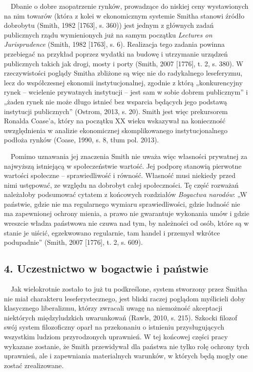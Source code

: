 \documentclass[a4paper]{article}
\begin{document}
\ \ Dbanie o dobre zaopatrzenie rynków, prowadzące do niskiej ceny wystawionych na nim towarów (która z kolei w ekonomicznym systemie Smitha stanowi źródło dobrobytu \label{ref:RND3lhiPntOYy}(Smith, 1982 [1763], s. 360)) jest jednym z głównych zadań publicznych rządu wymienionych już na samym początku \textit{Lectures on Jurisprudence }\label{ref:RNDcEz98pxQ1r}(Smith, 1982 [1763], s. 6). Realizacja tego zadania powinna przebiegać na przykład poprzez wydatki na budowę i utrzymanie urządzeń publicznych takich jak drogi, mosty i porty \label{ref:RNDun5237a8bv}(Smith, 2007 [1776], t. 2, s. 380). W rzeczywistości poglądy Smitha zbliżone są więc nie do radykalnego leseferyzmu, lecz do współczesnej ekonomii instytucjonalnej, zgodnie z którą „konkurencyjny rynek – wcielenie prywatnych instytucji – jest sam w sobie dobrem publicznym” i „żaden rynek nie może długo istnieć bez wsparcia będących jego podstawą instytucji publicznych” \label{ref:RNDjhM4fjDb9v}(Ostrom, 2013, s. 20). Smith jest więc prekursorem Ronalda Coase’a, który na początku XX wieku wskazywał na konieczność uwzględnienia w analizie ekonomicznej skomplikowanego instytucjonalnego podłoża rynków \label{ref:RNDGvBhji2UBe}(Coase, 1990, s. 8, tłum pol. 2013). 

 \ \ Pomimo uznawania jej znaczenia Smith nie uważa więc własności prywatnej za najwyższą istniejącą w społeczeństwie wartość. Jej podporę stanowią pierwotne wartości społeczne – sprawiedliwość i równość. Własność musi niekiedy przed nimi ustępować, ze względu na dobrobyt całej społeczności. Tę część rozważań należałoby podsumować cytatem z końcowych rozdziałów \textit{Bogactwa narodów}: „W państwie, gdzie nie ma regularnego wymiaru sprawiedliwości, gdzie ludność nie ma zapewnionej ochrony mienia, a prawo nie gwarantuje wykonania umów i gdzie wreszcie władza państwowa nie czuwa nad tym, by należności od osób, które są w stanie je uiścić, egzekwowano regularnie, tam handel i przemysł wkrótce podupadnie” \label{ref:RNDNF5lVCSa0q}(Smith, 2007 [1776], t. 2, s. 609).

\subsection[4. Uczestnictwo w bogactwie i państwie]{4. Uczestnictwo w bogactwie i państwie}
\ \ Jak wielokrotnie zostało to już tu podkreślone, system stworzony przez Smitha nie miał charakteru leseferystecznego, jest bliski raczej poglądom myślicieli doby klasycznego liberalizmu, którzy zwracali uwagę na niemożność akceptacji niektórych międzyludzkich uwarunkowań \label{ref:RNDu40KwlEMET}(Rawls, 2010, s. 215). Szkocki filozof swój system filozoficzny oparł na przekonaniu o istnieniu przysługujących wszystkim ludziom przyrodzonych uprawnień. W tej końcowej części pracy wykazane zostanie, że Smith przewidywał dla państwa nie tylko rolę ochrony tych uprawnień, ale i zapewniania materialnych warunków, w których będą mogły one zostać zrealizowane.
\end{document}
